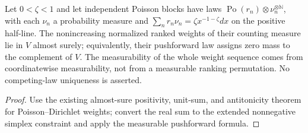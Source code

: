 \begin{lemma}\label{lem:sg:pd-simplex-law}
  \leanok
Let $0<\zeta<1$ and let independent Poisson blocks have laws
$\operatorname{Po}(r_n)\otimes\nu_n^{\otimes\mathbb N}$, with each $\nu_n$ a
probability measure and $\sum_n r_n\nu_n=\zeta x^{-1-\zeta}dx$ on the
positive half-line. The nonincreasing normalized ranked weights of their
counting measure lie in $V$ almost surely; equivalently, their pushforward
law assigns zero mass to the complement of $V$. The measurability of the
whole weight sequence comes from coordinatewise measurability, not from a
measurable ranking permutation. No competing-law uniqueness is asserted.
\end{lemma}
\begin{proof}
  \leanok
Use the existing almost-sure positivity, unit-sum, and antitonicity theorem
for Poisson--Dirichlet weights; convert the real sum to the extended
nonnegative simplex constraint and apply the measurable pushforward formula.
\end{proof}

